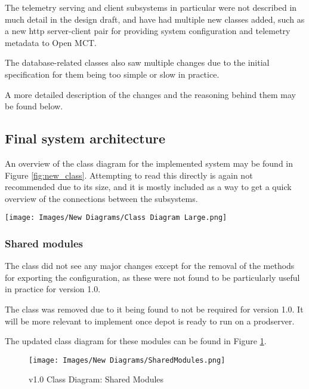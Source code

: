 The telemetry serving and client subsystems in particular were not described in much detail in the design draft, and have had multiple new classes added, such as a new \acrshort{http} server-client pair for providing system configuration and telemetry \gls{metadata} to Open MCT.

The database-related classes also saw multiple changes due to the initial specification for them being too simple or slow in practice.

A more detailed description of the changes and the reasoning behind them may be found below.

\subsection{Final system architecture}
An overview of the class diagram for the implemented system may be found in Figure \ref{fig:new_class}. Attempting to read this directly is again not recommended due to its size, and it is mostly included as a way to get a quick overview of the connections between the subsystems.

\begin{sidewaysfigure}[ht]
  \centering
  \texttt{[image: Images/New Diagrams/Class Diagram Large.png]}
  \caption{v1.0 Class Diagram Overview}
  \label{fig:new_class}
\end{sidewaysfigure}

\subsubsection{Shared modules}
The  class did not see any major changes except for the removal of the methods for exporting the configuration, as these were not found to be particularly useful in practice for version 1.0.

The  class was removed due to it being found to not be required for version 1.0. It will be more relevant to implement once \Gls{depot} is ready to run on a \gls{prodserver}.

The updated class diagram for these modules can be found in Figure \ref{fig:new_cdshared}.

\begin{figure}[H]
  \centering
  \texttt{[image: Images/New Diagrams/SharedModules.png]}
  \caption{v1.0 Class Diagram: Shared Modules}
  \label{fig:new_cdshared}
\end{figure}

